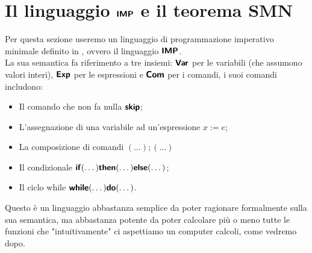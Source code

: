 \documentclass[openany]{book}
\begin{document}
\newcommand\imp{\catname{IMP}}
\newcommand\Var{\catname{Var}}
\newcommand\Input{\catname{Input}}
\newcommand\Output{\catname{Output}}
\newcommand\Temp{\catname{Temp}}
\newcommand\Exp{\catname{Exp}}
\newcommand\Com{\catname{Com}}
\renewcommand\skip{\catname{skip}}
\newcommand\while{\catname{while}}
\newcommand\doc{\catname{do}}
\newcommand\ifc{\catname{if}}
\newcommand\then{\catname{then}}
\newcommand\elsec{\catname{else}}

\newpage
\section{Il linguaggio $\imp$ e il teorema SMN}
\renewcommand\c{\mathbf{c}}

Per questa sezione useremo un linguaggio di programmazione imperativo minimale definito in \cite{Winskel1993}, ovvero il linguaggio $\imp$.\\
La sua semantica fa riferimento a tre insiemi: $\Var$ per le variabili (che assumono valori interi), $\Exp$ per le espressioni e $\Com$ per i comandi, i suoi comandi includono:\begin{itemize}
    \item Il comando che non fa nulla $\skip$;
    \item L'assegnazione di una variabile ad un'espressione $x:= e$;
    \item La composizione di comandi $(\dots);(\dots)$
    \item Il condizionale $\ifc(\dots)\then(\dots)\elsec(\dots)$;
    \item Il ciclo while $\while(\dots)\doc(\dots)$.
\end{itemize} 
Questo è un linguaggio abbastanza semplice da poter ragionare formalmente sulla sua semantica, ma abbastanza potente da poter calcolare più o meno tutte le funzioni che "intuitivamente" ci aspettiamo un computer calcoli, come vedremo dopo.
\end{document}
